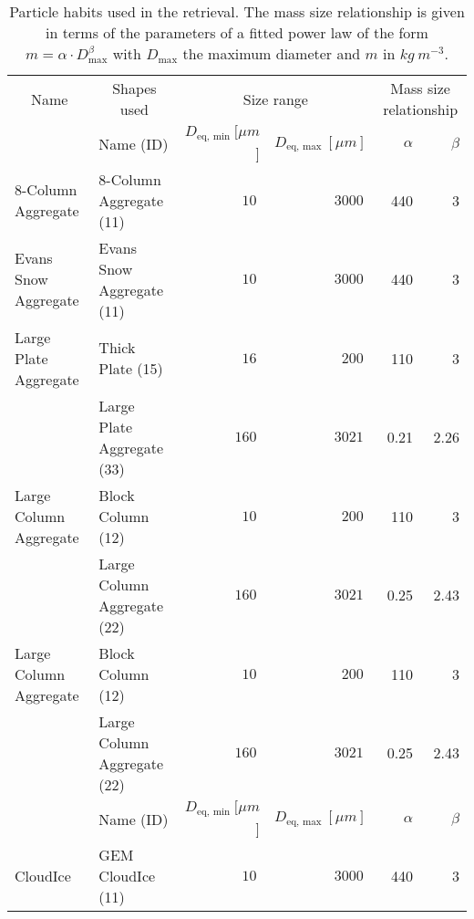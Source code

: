 \documentclass[journal abbreviation, manuscript]{copernicus}
\begin{document}
\begin{table}
  \centering
  \caption{Particle habits used in the retrieval. The mass size relationship is given
    in terms of the parameters
    of a fitted power law of the form $m = \alpha \cdot D_\text{max}^\beta$ with
    $D_\text{max}$ the maximum diameter and $m$ in $\unit{kg\ m^{-3}}$.}
  \begin{tabular}{l|l|rr|rr}
    \multicolumn{1}{c|}{Name} & \multicolumn{1}{c|}{Shapes used} &
    \multicolumn{2}{c|}{Size range} & \multicolumn{2}{c}{Mass size relationship}
    \\
    & Name (ID) &$D_{\text{eq}, \text{ min}}\ [\unit{\mu m}$] &
    $D_{\text{eq}, \text{ max}}\ [\unit{\mu m}]$ &\hfill
    $\alpha$ & \hfill $\beta$ \\
    \hline \hline %
    8-Column Aggregate & 8-Column Aggregate (11) & $10\ $ & $3000\ $ & \hfill 440 & \hfill 3 \\

    Evans Snow Aggregate & Evans Snow Aggregate (11) & $10\ $ & $3000\ $ & \hfill 440 & \hfill 3 \\

    \hline Large Plate Aggregate & Thick Plate (15) & $16\ $ & $200\ $ & \hfill
    110 & \hfill 3 \\ & Large Plate Aggregate (33) & $160\ $ & $3021\ $ & \hfill
    0.21 & \hfill 2.26 \\
    \hline Large Column Aggregate & Block Column (12) & $10\ $ & $200\ $ &
    \hfill 110 & \hfill 3 \\ & Large Column Aggregate (22) & $160\ $ & $3021\ $
    & \hfill 0.25 & \hfill 2.43 \\
    \hline Large Column Aggregate & Block Column (12) & $10\ $ & $200\ $ &
    \hfill 110 & \hfill 3 \\ & Large Column Aggregate (22) & $160\ $ & $3021\ $
    & \hfill 0.25 & \hfill 2.43 \\
    & Name (ID) &$D_{\text{eq}, \text{ min}}\ [\unit{\mu m}$] &
    $D_{\text{eq}, \text{ max}}\ [\unit{\mu m}]$ &\hfill
    $\alpha$ & \hfill $\beta$ \\
    \hline \hline %
    CloudIce & GEM CloudIce (11) & $10\ $ & $3000\ $ & \hfill 440 & \hfill 3 \\
  \end{tabular}
  \label{tab:particle_properties}
\end{table}
\end{document}
